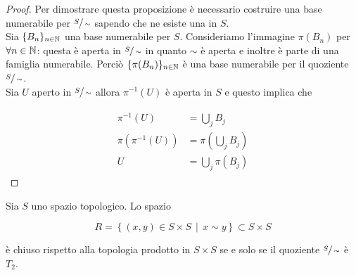 \begin{proof}\label{solved-es2-4}
	Per dimostrare questa proposizione è necessario costruire una base numerabile per $ \sfrac{S}{\sim} $ sapendo che ne esiste una in $ S $.\\
	Sia $ \{B_{n}\}_{n \in \mathbb{N}} $ una base numerabile per $ S $. Consideriamo l'immagine $ \pi(B_{n}) $ per $ \forall n \in \mathbb{N} $: questa è aperta in $ \sfrac{S}{\sim} $ in quanto $ \sim $ è aperta e inoltre è parte di una famiglia numerabile. Perciò $ \{\pi(B_{n})\}_{n \in \mathbb{N}} $ è una base numerabile per il quoziente $ \sfrac{S}{\sim} $.\\
	Sia $ U $ aperto in $ \sfrac{S}{\sim} $ allora $ \pi^{-1}(U) $ è aperta in $ S $ e questo implica che
	
	\begin{align}
		\begin{split}
			\pi^{-1}(U) &= \bigcup_{j} B_{j}\\
			\pi(\pi^{-1}(U)) &= \pi \left( \bigcup_{j} B_{j} \right)\\
			U &= \bigcup_{j} \pi(B_{j})
		\end{split}
	\end{align}
\end{proof}

\begin{definition}\label{prop-t2}
	Sia $ S $ uno spazio topologico. Lo spazio
	
	\begin{equation}
		R = \left\{ (x,y) \in S \times S \, \middle| \, x \sim y \right\} \subset S \times S
	\end{equation}

	è chiuso rispetto alla topologia prodotto in $ S \times S $ se e solo se il quoziente $ \sfrac{S}{\sim} $ è $ T_{2} $.
\end{definition}

